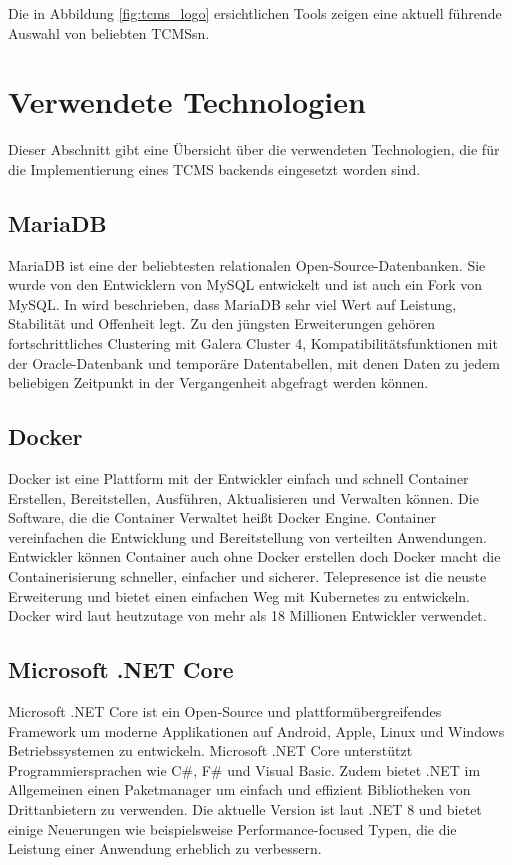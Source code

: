 \documentclass[a4paper, fontsize=11pt, parskip=half, twoside]{scrreprt}
\begin{document}
	Die in Abbildung \ref{fig:tcms_logo} ersichtlichen Tools zeigen eine aktuell führende Auswahl von beliebten \aclp{TCMS}n.  
	
	\section{Verwendete Technologien}
	Dieser Abschnitt gibt eine Übersicht über die verwendeten Technologien, die für die Implementierung eines \acl{TCMS} backends eingesetzt worden sind.
	
	\subsection{MariaDB}
	MariaDB ist eine der beliebtesten relationalen Open-Source-Datenbanken. 
	Sie wurde von den Entwicklern von MySQL entwickelt und ist auch ein Fork von MySQL. 
	In \textcite{noauthor_mariadb_nodate} wird beschrieben, dass MariaDB sehr viel Wert auf Leistung, Stabilität und Offenheit legt. 
	Zu den jüngsten Erweiterungen gehören fortschrittliches Clustering mit Galera Cluster 4, Kompatibilitätsfunktionen mit der Oracle-Datenbank und temporäre Datentabellen, mit denen Daten zu jedem beliebigen Zeitpunkt in der Vergangenheit abgefragt werden können.
	
	\textcite{noauthor_mariadb_nodate}
	
	\subsection{Docker}
	Docker ist eine Plattform mit der Entwickler einfach und schnell Container Erstellen, Bereitstellen, Ausführen, Aktualisieren und Verwalten können.
	Die Software, die die Container Verwaltet heißt Docker Engine.
	Container vereinfachen die Entwicklung und Bereitstellung von verteilten Anwendungen. 
	Entwickler können Container auch ohne Docker erstellen doch Docker macht die Containerisierung schneller, einfacher und sicherer. 
	Telepresence ist die neuste Erweiterung und bietet einen einfachen Weg mit Kubernetes zu entwickeln.
	Docker wird laut \textcite{noauthor_docker_2022} heutzutage von mehr als 18 Millionen Entwickler verwendet.
	
	\textcite{ghosh_docker_2020}
	
	\subsection{Microsoft .NET Core} \label{subsec:msNetCore}
	Microsoft .NET Core ist ein Open-Source und plattformübergreifendes Framework um moderne Applikationen auf Android, Apple, Linux und Windows Betriebssystemen zu entwickeln.
	Microsoft .NET Core unterstützt Programmiersprachen wie C\#, F\# und Visual Basic.
	Zudem bietet .NET im Allgemeinen einen Paketmanager um einfach und effizient Bibliotheken von Drittanbietern zu verwenden.
	Die aktuelle Version ist laut \textcite{billwagner_net_nodate} .NET 8 und bietet einige Neuerungen wie beispielsweise Performance-focused Typen, die die Leistung einer Anwendung erheblich zu verbessern.
	
\end{document}
